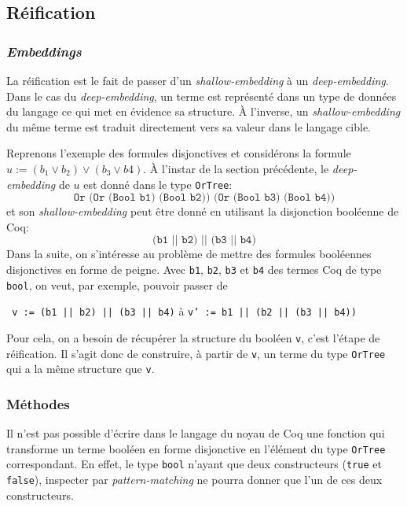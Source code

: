 \documentclass[11pt]{article}
\begin{document}
\subsection{Réification} \label{reification}

\subsubsection{\textit{Embeddings}}

La réification est le fait de passer d'un \textit{shallow-embedding} à un \textit{deep-embedding}. Dans le cas du \textit{deep-embedding}, un terme est représenté dans un type de données du langage ce qui met en évidence sa structure. À l'inverse, un \textit{shallow-embedding} du même terme est traduit directement vers sa valeur dans le langage cible. \medbreak

Reprenons l'exemple des formules disjonctives et considérons la formule $ u := (b_1 \vee b_2) \vee (b_3 \vee b4)$. À l'instar de la section précédente, le \textit{deep-embedding} de $u$ est donné dans le type \texttt{OrTree}:
\[\texttt{Or (Or (Bool b1) (Bool b2)) (Or (Bool b3) (Bool b4))}\] 
et son \textit{shallow-embedding} peut être donné en utilisant la disjonction booléenne de Coq: 
\[\texttt{(b1 || b2) || (b3 || b4)} \]
Dans la suite, on s'intéresse au problème de mettre des formules booléennes disjonctives en forme de peigne. Avec \texttt{b1}, \texttt{b2}, \texttt{b3} et \texttt{b4} des termes Coq de type \texttt{bool}, on veut, par exemple, pouvoir passer de
\begin{center}
\texttt{ v := (b1 || b2) || (b3 || b4)}  \hspace{.5cm} à   \hspace{.5cm}  \texttt{v' := b1 || (b2 || (b3 || b4))}
\end{center}
Pour cela, on a besoin de récupérer la structure du booléen \texttt{v}, c'est l'étape de réification. Il s'agit donc de construire, à partir de \texttt{v}, un terme du type \texttt{OrTree} qui a la même structure que \texttt{v}.

\subsubsection{Méthodes}

Il n'est pas possible d'écrire dans le langage du noyau de Coq une fonction qui transforme un terme booléen en forme disjonctive en l'élément du type \texttt{OrTree} correspondant. En effet, le type \texttt{bool} n'ayant que deux constructeurs (\texttt{true} et \texttt{false}), inspecter par \textit{pattern-matching} ne pourra donner que l'un de ces deux constructeurs.\medbreak
\end{document}
